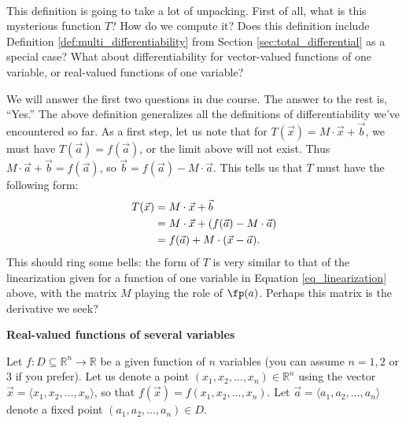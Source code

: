 \\

This definition is going to take a lot of unpacking. First of all, what is this mysterious function $T$? How do we compute it? Does this definition include Definition \ref{def:multi_differentiability} from Section \ref{sec:total_differential} as a special case? What about differentiability for vector-valued functions of one variable, or real-valued functions of one variable?

We will answer the first two questions in due course. The answer to the rest is, ``Yes.'' The above definition generalizes all the definitions of differentiability we've encountered so far. As a first step, let us note that for $T(\vec{x})=M\cdot \vec{x}+\vec{b}$, we must have $T(\vec{a})=f(\vec{a})$, or the limit above will not exist. Thus $M\cdot \vec{a}+\vec{b} = f(\vec{a})$, so $\vec{b}=f(\vec{a})-M\cdot \vec{a}$. This tells us that $T$ must have the following form:
\begin{align}
T(\vec{x}) &= M\cdot \vec{x} + \vec{b}\notag\\
&= M\cdot \vec{x} + (f(\vec{a}) - M\cdot \vec{a})\notag\\
& = f(\vec{a})+M\cdot (\vec{x}-\vec{a}).\label{eq_gen_linear}
\end{align}
This should ring some bells: the form of $T$ is very similar to that of the linearization given for a function of one variable in Equation \eqref{eq_linearization} above, with the matrix $M$ playing the role of $\fp(a)$. Perhaps this matrix is the derivative we seek?\pagebreak
 
\noindent\textbf{\large Real-valued functions of several variables}

Let $f:D\subseteq \mathbb{R}^n\to \mathbb{R}$ be a given function of $n$ variables (you can assume $n=1, 2$ or 3 if you prefer). Let us denote a point $(x_1,x_2,\ldots, x_n)\in\mathbb{R}^n$ using the vector $\vec x = \langle x_1,x_2,\ldots, x_n\rangle$, so that $f(\vec x) = f(x_1,x_2,\ldots,x_n)$. Let $\vec a = \langle a_1,a_2,\ldots, a_n\rangle$ denote a fixed point $(a_1,a_2,\ldots, a_n)\in D$.

